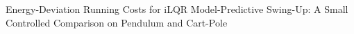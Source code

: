 Energy-Deviation Running Costs for iLQR Model-Predictive Swing-Up: A Small Controlled Comparison on Pendulum and Cart-Pole
